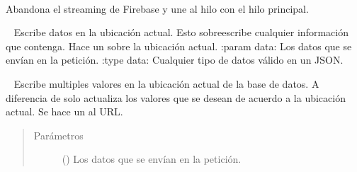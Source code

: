 \begin{fulllineitems}
\begin{fulllineitems}
\end{fulllineitems}


\begin{fulllineitems}
\label{\detokenize{nao_firebase:firebase.FirebaseDatabase.remove_event_listener}}~

\begin{fulllineitems}
\end{fulllineitems}


Abandona el streaming de Firebase y une al hilo con el hilo principal.

\end{fulllineitems}


\begin{fulllineitems}
\label{\detokenize{nao_firebase:firebase.FirebaseDatabase.set}}~
Escribe datos en la ubicación actual. Esto sobreescribe cualquier información
que contenga.
Hace un  sobre la ubicación actual.
:param data: Los datos que se envían en la petición.
:type data: Cualquier tipo de datos válido en un JSON.

\end{fulllineitems}


\begin{fulllineitems}
\label{\detokenize{nao_firebase:firebase.FirebaseDatabase.update}}~
Escribe multiples valores en la ubicación actual de la base de datos. A diferencia
de {\hyperref[\detokenize{nao_firebase:firebase.FirebaseDatabase.set}]{}} solo actualiza los valores que se desean de acuerdo a la ubicación
actual. Se hace un  al URL.
\begin{quote}\begin{description}
\item[{Parámetros}] \leavevmode
{} () \textendash{} Los datos que se envían en la petición.

\end{description}\end{quote}

\end{fulllineitems}


\end{fulllineitems}

